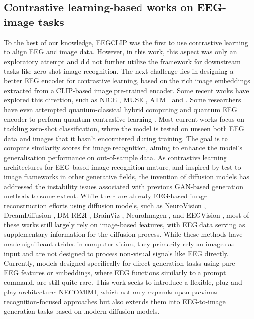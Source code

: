 \documentclass{article}
\begin{document}
\subsection{Contrastive learning-based works on EEG-image tasks}
To the best of our knowledge, EEGCLIP \cite{EEGCLIP_2024} was the first to use contrastive learning to align EEG and image data. However, in this work, this aspect was only an exploratory attempt and did not further utilize the framework for downstream tasks like zero-shot image recognition. The next challenge lies in designing a better EEG encoder for contrastive learning, based on the rich image embeddings extracted from a CLIP-based image pre-trained encoder. Some recent works have explored this direction, such as NICE \cite{nice_2023}, MUSE \cite{muse_2024}, ATM \cite{atm_2024}, and \cite{vesdn_2024}. Some researchers have even attempted quantum-classical hybrid computing and quantum EEG encoder \cite{qeegnet_2024} to perform quantum contrastive learning \cite{chen_mcl_2024}. Most current works focus on tackling zero-shot classification, where the model is tested on unseen both EEG data and images that it hasn't encountered during training. The goal is to compute similarity scores for image recognition, aiming to enhance the model's generalization performance on out-of-sample data. As contrastive learning architectures for EEG-based image recognition mature, and inspired by test-to-image frameworks in other generative fields, the invention of diffusion models has addressed the instability issues associated with previous GAN-based generation methods to some extent. While there are already EEG-based image reconstruction efforts using diffusion models, such as NeuroVision \cite{khare_choubey_amar_udutalapalli_2022}, DreamDiffusion \cite{bai_wang_cao_ge_yuan_shan_2023}, DM-RE2I \cite{DM-RE2I_2023}, BrainViz \cite{BrainViz_2023}, NeuroImagen \cite{NeuroImagen_2023}, and EEGVision \cite{guo_2024}, most of these works still largely rely on image-based features, with EEG data serving as supplementary information for the diffusion process. While these methods have made significant strides in computer vision, they primarily rely on images as input and are not designed to process non-visual signals like EEG directly. Currently, models designed specifically for direct generation tasks using pure EEG features or embeddings, where EEG functions similarly to a prompt command, are still quite rare. This work seeks to introduce a flexible, plug-and-play architecture: NECOMIMI, which not only expands upon previous recognition-focused approaches but also extends them into EEG-to-image generation tasks based on modern diffusion models.
\end{document}
